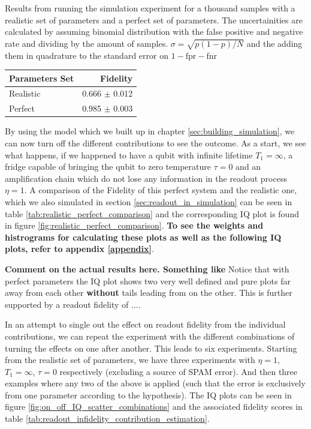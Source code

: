 \begin{margintable}
    \centering
    \caption{Results from running the simulation experiment for a thousand samples with a realistic set of parameters and a perfect set of parameters. The uncertainities are calculated by assuming binomial distribution with the false positive and negative rate and dividing by the amount of samples. $\sigma = \sqrt{p (1-p) / N}$ and the adding them in quadrature to the standard error on $1 - \text{fpr} - \text{fnr}$}
    \begin{tabular}{l|r}
    \hline
         Parameters Set & Fidelity \\ \hline
         Realistic & 0.666 $\pm$ 0.012  \\
         Perfect   & 0.985 $\pm$ 0.003
    \end{tabular}
    \label{tab:realistic_perfect_comparison}
\end{margintable}

By using the model which we built up in chapter \ref{sec:building_simulation}, we can now turn off the different contributions to see the outcome. As a start, we see what happens, if we happened to have a qubit with infinite lifetime $T_1 = \infty$, a fridge capable of bringing the qubit to zero temperature $\tau = 0$ and an amplification chain which do not lose any information in the readout process $\eta = 1$. A comparison of the Fidelity of this perfect system and the realistic one, which we also simulated in section \ref{sec:readout_in_simulation} can be seen in table \ref{tab:realistic_perfect_comparison} and the corresponding IQ plot is found in figure \ref{fig:realistic_perfect_comparison}. \textbf{To see the weights and histrograms for calculating these plots as well as the following IQ plots, refer to appendix \ref{appendix}}.



\textbf{Comment on the actual results here. Something like} Notice that with perfect parameters the IQ plot shows two very well defined and pure plots far away from each other \textbf{without} tails leading from on the other. This is further supported by a readout fidelity of $... $. 




In an attempt to single out the effect on readout fidelity from the individual contributions, we can repeat the experiment with the different combinations of turning the effects on one after another. This leads to six experiments. Starting from the realistic set of parameters, we have three experiments with $\eta = 1$, $T_1 = \infty$, $\tau = 0$ respectively (excluding a source of SPAM error). And then three examples where any two of the above is applied (such that the error is exclusively from one parameter according to the hypothesis). The IQ plots can be seen in figure \ref{fig:on_off_IQ_scatter_combinations} and the associated fidelity scores in table \ref{tab:readout_infidelity_contribution_estimation}.

